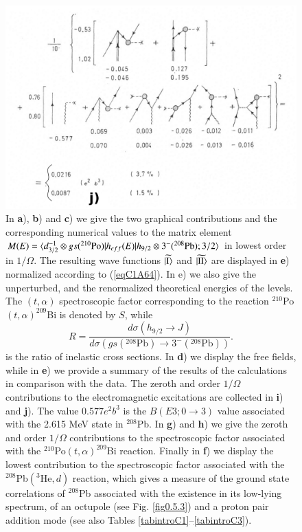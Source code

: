               \begin{figure}
                   \captionsetup{singlelinecheck=off}
                   \centerline {
                   \includegraphics*[width=12cm]{introduccion/figs/fig24c}
                   }
                   \caption[.]{In \textbf{a}), \textbf{b}) and \textbf{c}) we give the two graphical contributions and the corresponding numerical values to the matrix element $M(E)=\langle {d_{3/2}^{-1}\otimes gs(^{210}\text{Po})|h_{eff}(E)|h_{9/2}\otimes 3^-(^{208}\text{Pb});3/2} \rangle$ in lowest order in $1/\Omega.$ The resulting wave functions $\widetilde{|{\text{I}} \rangle}$ and $\widetilde{|{\text{II}} \rangle}$ are displayed in \textbf{e}) normalized according to (\ref{eqC1A64}). In e) we also give the unperturbed, and the renormalized theoretical energies of the levels. The $(t,\alpha)$ spectroscopic factor corresponding to the reaction $^{210}$Po$(t,\alpha)^{209}$Bi is denoted by $S$, while 
                    \begin{equation*}
                    R=\frac{d\sigma(h_{9/2}\rightarrow J)}{d\sigma(gs(^{208}\text{Pb})\rightarrow3^-(^{208}\text{Pb}))}.
                    \end{equation*}
                     is the ratio of inelastic cross sections. In \textbf{d}) we display the free fields, while in \textbf{e}) we provide a summary
                     of the results of the calculations in comparison with the data. The zeroth and order $1/\Omega$ contributions to the electromagnetic excitations are collected in \textbf{i}) and \textbf{j}). The value $0.577 e^2b^3$ is the $B(E3;0\rightarrow 3)$ value associated with the 2.615 MeV state in $^{208}$Pb. In \textbf{g}) and \textbf{h}) we give the zeroth and order $1/\Omega$ contributions to the spectroscopic factor associated with the $^{210}$Po$(t,\alpha)^{209}$Bi reaction. Finally in \textbf{f}) we display the lowest contribution to the spectroscopic factor associated with the $^{208}$Pb$(^3\text{He},d)$ reaction, which gives a measure of the ground state correlations of $^{208}$Pb associated with the existence in its low-lying spectrum, of an octupole (see Fig. \ref{fig0.5.3}) and a proton pair addition mode (see also Tables \ref{tabintroC1}--\ref{tabintroC3}).}
                   \label{figC1A7}
                   \end{figure}

